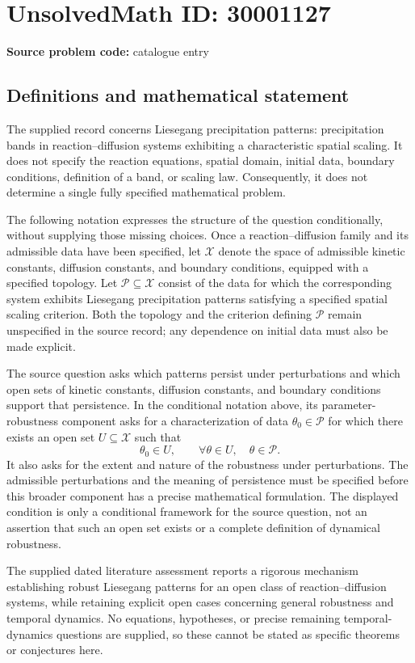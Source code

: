 \documentclass[11pt]{article}
\begin{document}
\section*{UnsolvedMath ID: 30001127}
\textbf{Source problem code:} catalogue entry
\subsection{Definitions and mathematical statement}
The supplied record concerns Liesegang precipitation patterns: precipitation bands in reaction--diffusion systems exhibiting a characteristic spatial scaling. It does not specify the reaction equations, spatial domain, initial data, boundary conditions, definition of a band, or scaling law. Consequently, it does not determine a single fully specified mathematical problem.

The following notation expresses the structure of the question conditionally, without supplying those missing choices. Once a reaction--diffusion family and its admissible data have been specified, let \(\mathcal X\) denote the space of admissible kinetic constants, diffusion constants, and boundary conditions, equipped with a specified topology. Let \(\mathcal P\subseteq\mathcal X\) consist of the data for which the corresponding system exhibits Liesegang precipitation patterns satisfying a specified spatial scaling criterion. Both the topology and the criterion defining \(\mathcal P\) remain unspecified in the source record; any dependence on initial data must also be made explicit.

The source question asks which patterns persist under perturbations and which open sets of kinetic constants, diffusion constants, and boundary conditions support that persistence. In the conditional notation above, its parameter-robustness component asks for a characterization of data \(\theta_0\in\mathcal P\) for which there exists an open set \(U\subseteq\mathcal X\) such that
\[
\theta_0\in U,
\qquad
\forall\theta\in U,\quad \theta\in\mathcal P.
\]
It also asks for the extent and nature of the robustness under perturbations. The admissible perturbations and the meaning of persistence must be specified before this broader component has a precise mathematical formulation. The displayed condition is only a conditional framework for the source question, not an assertion that such an open set exists or a complete definition of dynamical robustness.

The supplied dated literature assessment reports a rigorous mechanism establishing robust Liesegang patterns for an open class of reaction--diffusion systems, while retaining explicit open cases concerning general robustness and temporal dynamics. No equations, hypotheses, or precise remaining temporal-dynamics questions are supplied, so these cannot be stated as specific theorems or conjectures here.
\end{document}
